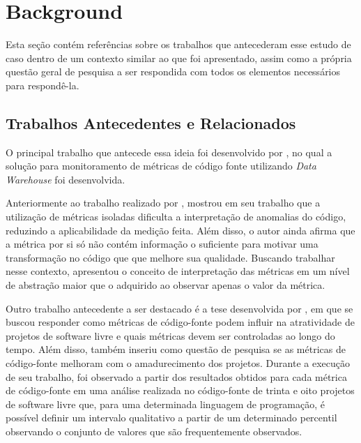 \section{Background}\label{sec:Background}

Esta seção contém referências sobre os trabalhos que antecederam esse estudo de caso dentro de um contexto similar ao que foi apresentado, assim como a própria questão geral de pesquisa a ser respondida com todos os elementos necessários para respondê-la.

\subsection{Trabalhos Antecedentes e Relacionados}

O principal trabalho que antecede essa ideia foi desenvolvido por , no qual a solução para monitoramento de métricas de código fonte utilizando \textit{Data Warehouse} foi desenvolvida.

Anteriormente ao trabalho realizado por ,  mostrou em seu trabalho que a utilização de métricas isoladas dificulta a interpretação de anomalias do código, reduzindo a aplicabilidade da medição feita. Além disso, o autor ainda afirma que a métrica por si só não contém informação o suficiente para motivar uma transformação no código que que melhore sua qualidade. Buscando trabalhar nesse contexto,  apresentou o conceito de interpretação das métricas em um nível de abstração maior que o adquirido ao observar apenas o valor da métrica.

Outro trabalho antecedente a ser destacado é a tese desenvolvida por , em que se buscou responder como métricas de código-fonte podem influir na atratividade de projetos de software livre e quais métricas devem ser controladas ao longo do tempo. Além disso,  também inseriu como questão de pesquisa se as métricas de código-fonte melhoram com o amadurecimento dos projetos. Durante a execução de seu trabalho, foi observado a partir dos resultados obtidos para cada métrica de
código-fonte em uma análise realizada no código-fonte de trinta e oito projetos de software livre que, para uma determinada linguagem de programação, é possível definir um intervalo qualitativo a partir de um determinado percentil observando o conjunto de valores que são frequentemente observados.

